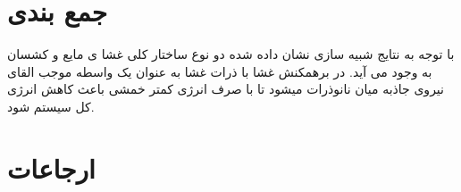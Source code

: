 \documentclass[12pt,onecolumn,a4paper]{report}
\begin{document}
\section{\LARGE{جمع بندی}}
با توجه به نتایج شبیه سازی نشان داده شده دو نوع ساختار کلی غشا ی مایع و کشسان به وجود می آید. در برهمکنش غشا با ذرات غشا به عنوان یک واسطه موجب القای نیروی جاذبه میان نانوذرات میشود تا با صرف انرژی کمتر خمشی باعث کاهش انرژی کل سیستم شود.\\




\section{\LARGE{ارجاعات}}

\\
\\



\end{document}
